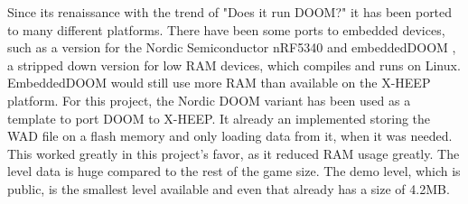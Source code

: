 Since its renaissance with the trend of "Does it run DOOM?" it has been ported to many different platforms. There have been some ports to embedded devices, such as a version for the Nordic Semiconductor nRF5340 \cite{nordicDOOM} and embeddedDOOM \cite{embeddedDOOM}, a stripped down version for low RAM devices, which compiles and runs on Linux. EmbeddedDOOM would still use more RAM than available on the X-HEEP platform.
For this project, the Nordic DOOM variant has been used as a template to port DOOM to X-HEEP. It already an implemented storing the WAD file on a flash memory and only loading data from it, when it was needed. This worked greatly in this project's favor, as it reduced RAM usage greatly. The level data is huge compared to the rest of the game size. The demo level, which is public, is the smallest level available and even that already has a size of  4.2MB.
